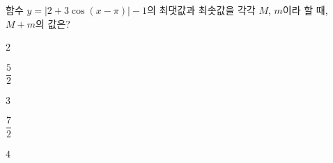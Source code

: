 함수 $y=|2+3\cos(x-\pi)|-1$의 최댓값과 최솟값을 각각 $M$, $m$이라 할 때, $M+m$의 값은?
\begin{choices32}{\rule[-3ex]{0pt}{8ex}$2$}{\rule[-3ex]{0pt}{8ex}$\dfrac{5}{2}$}{\rule[-3ex]{0pt}{8ex}$3$}{\rule[-3ex]{0pt}{8ex}$\dfrac{7}{2}$}{\rule[-3ex]{0pt}{8ex}$4$}\end{choices32}
